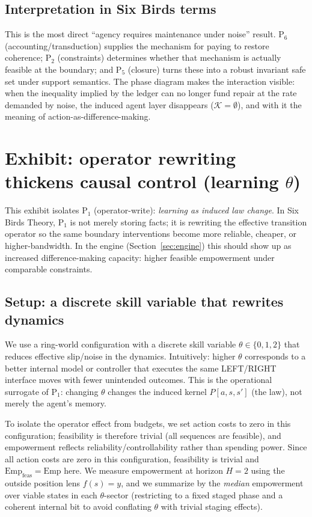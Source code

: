 \documentclass[11pt]{article}
\newcommand{\SBT}{Six Birds Theory}
\newcommand{\Emp}{\mathrm{Emp}}
\newcommand{\K}{\mathcal{K}}
\begin{document}
\subsection{Interpretation in Six Birds terms}
This is the most direct ``agency requires maintenance under noise'' result. P$_6$ (accounting/transduction) supplies the mechanism for paying to restore coherence; P$_2$ (constraints) determines whether that mechanism is actually feasible at the boundary; and P$_5$ (closure) turns these into a robust invariant safe set under support semantics. The phase diagram makes the interaction visible: when the inequality implied by the ledger can no longer fund repair at the rate demanded by noise, the induced agent layer disappears ($\K=\emptyset$), and with it the meaning of action-as-difference-making.
 \section{Exhibit: operator rewriting thickens causal control (learning $\theta$)}
\label{sec:ex_learning}

This exhibit isolates P$_1$ (operator-write): \emph{learning as induced law change}. In \SBT, P$_1$ is not merely storing facts; it is rewriting the effective transition operator so the same boundary interventions become more reliable, cheaper, or higher-bandwidth. In the engine (Section~\ref{sec:engine}) this should show up as increased difference-making capacity: higher feasible empowerment under comparable constraints.

\subsection{Setup: a discrete skill variable that rewrites dynamics}
We use a ring-world configuration with a discrete skill variable $\theta\in\{0,1,2\}$ that reduces effective slip/noise in the dynamics. Intuitively: higher $\theta$ corresponds to a better internal model or controller that executes the same LEFT/RIGHT interface moves with fewer unintended outcomes. This is the operational surrogate of P$_1$: changing $\theta$ changes the induced kernel $P[a,s,s']$ (the law), not merely the agent's memory.

To isolate the operator effect from budgets, we set action costs to zero in this configuration; feasibility is therefore trivial (all sequences are feasible), and empowerment reflects reliability/controllability rather than spending power. Since all action costs are zero in this configuration, feasibility is trivial and $\Emp_{\mathrm{feas}}=\Emp$ here. We measure empowerment at horizon $H=2$ using the outside position lens $f(s)=y$, and we summarize by the \emph{median} empowerment over viable states in each $\theta$-sector (restricting to a fixed staged phase and a coherent internal bit to avoid conflating $\theta$ with trivial staging effects).
\end{document}
